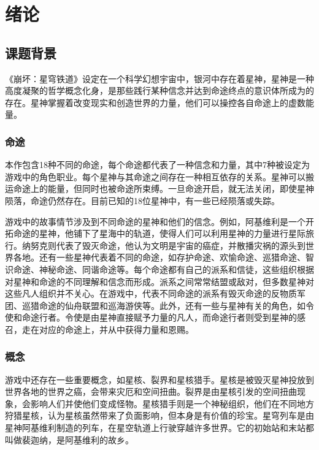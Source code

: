 \chapter{绪论}
\vspace{0.5cm}


\section{课题背景}

《崩坏：星穹铁道》设定在一个科学幻想宇宙中\cite{exampleid1}，银河中存在着星神，星神是一种高度凝聚的哲学概念化身，是那些践行某种信念并达到命途终点的意识体所成为的存在。星神掌握着改变现实和创造世界的力量，他们可以操控各自命途上的虚数能量。

\subsection{命途}

本作包含18种不同的命途，每个命途都代表了一种信念和力量，其中7种被设定为游戏中的角色职业。每个星神与其命途之间存在一种相互依存的关系。星神可以搬运命途上的能量，但同时也被命途所束缚。一旦命途开启，就无法关闭，即使星神陨落，命途仍然存在。目前已知的18位星神中，有一些已经陨落或失踪。

游戏中的故事情节涉及到不同命途的星神和他们的信念。例如，阿基维利是一个开拓命途的星神，他铺下了星海中的轨道，使得人们可以利用星神的力量进行星际旅行。纳努克则代表了毁灭命途，他认为文明是宇宙的癌症，并散播灾祸的源头到世界各地。还有一些星神代表着不同的命途，如存护命途、欢愉命途、巡猎命途、智识命途、神秘命途、同谐命途等。每个命途都有自己的派系和信徒，这些组织根据对星神和命途的不同理解和信念而形成。派系之间常常结盟或敌对，但多数星神对这些凡人组织并不关心。在游戏中，代表不同命途的派系有毁灭命途的反物质军团、巡猎命途的仙舟联盟和巡海游侠等。此外，还有一些与星神有关的角色，如令使和命途行者。令使是由星神直接赋予力量的凡人，而命途行者则受到星神的感召，走在对应的命途上，并从中获得力量和恩赐。

\subsection{概念}

游戏中还存在一些重要概念，如星核、裂界和星核猎手。星核是被毁灭星神投放到世界各地的世界之癌，会带来灾厄和空间扭曲。裂界是由星核引发的空间扭曲现象，会影响人们并使他们变成怪物。星核猎手则是一个神秘组织，他们在不同地方狩猎星核，认为星核虽然带来了负面影响，但本身是有价值的珍宝。星穹列车是由星神阿基维利制造的列车，在星空轨道上行驶穿越许多世界。它的初始站和末站都叫做裴迦纳，是阿基维利的故乡。

